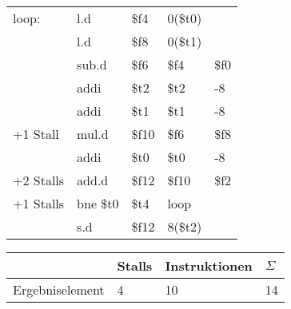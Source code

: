 \begin{enumerate}[(a)]
{
	\ttfamily
	\begin{tabular}{l llll}
		loop:                        & l.d      & \$f4                     & 0(\$t0)               &                \\
		                             & l.d      & \$f8                     & 0(\$t1)               &                \\
		                             & sub.d    & \color{Maroon}\$f6       & \$f4                  & \$f0           \\
		                             & addi     & \$t2                     & \$t2                  & \color{red} -8 \\
		                             & addi     & \$t1                     & \$t1                  & -8             \\
		\color{Maroon}+1 Stall       & mul.d    & \color{NavyBlue}\$f10    & \color{Maroon}\$f6    & \$f8           \\
		                             & addi     & \$t0                     & \$t0                  & -8             \\
		\color{NavyBlue}+2 Stalls    & add.d    & \color{ForestGreen}\$f12 & \color{NavyBlue}\$f10 & \$f2           \\
		\color{ForestGreen}+1 Stalls & bne \$t0 & \$t4                     & loop                  &                \\
		                             & s.d      & \color{ForestGreen}\$f12 & \color{red}8(\$t2)    &
	\end{tabular}
}
	\begin{tabular}{llll}
		\hline
		                & Stalls & Instruktionen & $ \Sigma $ \\ \hline
		Ergebniselement & 4      & 10            & 14         \\ \hline
	\end{tabular}

\end{enumerate}